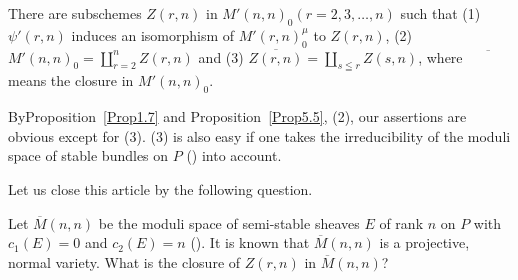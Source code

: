 \begin{Theorem}\label{Theorem5.6}
There are subschemes $Z(r,n)$ in $M'(n,n)_0 (r=2,3,\ldots, n)$ such
that {\rm(1)} $\psi'(r,n)$ induces an isomorphism of $M'(r,n)^{\mu}_0$ to
$Z(r,n)$, {\rm(2)} $M'(n,n)_0=\coprod\limits^{n}_{r=2}Z(r,n)$ and {\rm(3)}
$\overline{Z(r,n)}=\coprod\limits_{s\leqq r}Z(s,n)$, where
$\overline{\phantom{AAAA}}$ means the
closure in $M'(n,n)_0$.
\end{Theorem}

\begin{Proof}
By\pageoriginale Proposition~\ref{Prop1.7} and
Proposition~\ref{Prop5.5}, (2), our 
assertions are obvious except for (3). (3) is also easy if one
takes the irreducibility of the moduli space of stable bundles on $P$
(\cite[see, for example,]{key6}) into account. 
\end{Proof}

Let us close this article by the following question.

\begin{Ques}
Let $\overline{M}(n,n)$ be the moduli space of semi-stable sheaves $E$
of rank $n$ on $P$ with $c_1(E)=0$ and $c_2(E)=n$ (\cite{key10}). It
is known that $\overline{M}(n,n)$ is a projective, normal
variety. What is the closure of $Z(r,n)$ in $\overline{M}(n,n)$?
\end{Ques}


